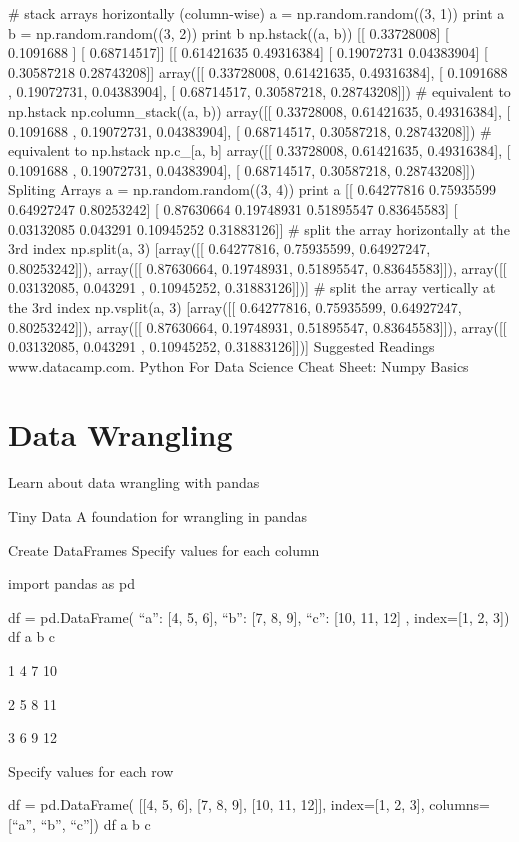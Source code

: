 # stack arrays horizontally (column-wise)
a = np.random.random((3, 1))
print a
b = np.random.random((3, 2))
print b
np.hstack((a, b))
[[ 0.33728008] [ 0.1091688 ] [ 0.68714517]] [[ 0.61421635 0.49316384] [ 0.19072731 0.04383904] [ 0.30587218 0.28743208]] array([[ 0.33728008, 0.61421635, 0.49316384], [ 0.1091688 , 0.19072731, 0.04383904], [ 0.68714517, 0.30587218, 0.28743208]])
# equivalent to np.hstack
np.column_stack((a, b))
array([[ 0.33728008, 0.61421635, 0.49316384], [ 0.1091688 , 0.19072731, 0.04383904], [ 0.68714517, 0.30587218, 0.28743208]])
# equivalent to np.hstack
np.c_[a, b]
array([[ 0.33728008, 0.61421635, 0.49316384], [ 0.1091688 , 0.19072731, 0.04383904], [ 0.68714517, 0.30587218, 0.28743208]])
Spliting Arrays
a = np.random.random((3, 4))
print a
[[ 0.64277816 0.75935599 0.64927247 0.80253242] [ 0.87630664 0.19748931 0.51895547 0.83645583] [ 0.03132085 0.043291 0.10945252 0.31883126]]
# split the array horizontally at the 3rd index
np.split(a, 3)
[array([[ 0.64277816, 0.75935599, 0.64927247, 0.80253242]]), array([[ 0.87630664, 0.19748931, 0.51895547, 0.83645583]]), array([[ 0.03132085, 0.043291 , 0.10945252, 0.31883126]])]
# split the array vertically at the 3rd index
np.vsplit(a, 3)
[array([[ 0.64277816, 0.75935599, 0.64927247, 0.80253242]]), array([[ 0.87630664, 0.19748931, 0.51895547, 0.83645583]]), array([[ 0.03132085, 0.043291 , 0.10945252, 0.31883126]])]
Suggested Readings
www.datacamp.com. Python For Data Science Cheat Sheet: Numpy Basics

\section{Data Wrangling}

Learn about data wrangling with pandas

Tiny Data
A foundation for wrangling in pandas



Create DataFrames
Specify values for each column

import pandas as pd

df = pd.DataFrame({
“a”: [4, 5, 6],
“b”: [7, 8, 9],
“c”: [10, 11, 12]
}, index=[1, 2, 3])
df
a b c

1 4 7 10

2 5 8 11

3 6 9 12

Specify values for each row

df = pd.DataFrame(
[[4, 5, 6],
[7, 8, 9],
[10, 11, 12]],
index=[1, 2, 3],
columns=[“a”, “b”, “c”])
df
a b c

